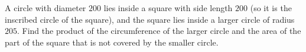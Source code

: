 A circle with diameter $200$ lies inside a square with side length $200$ (so it is the inscribed circle of the square), and the square lies inside a larger circle of radius $205$. Find the product of the circumference of the larger circle and the area of the part of the square that is not covered by the smaller circle.
